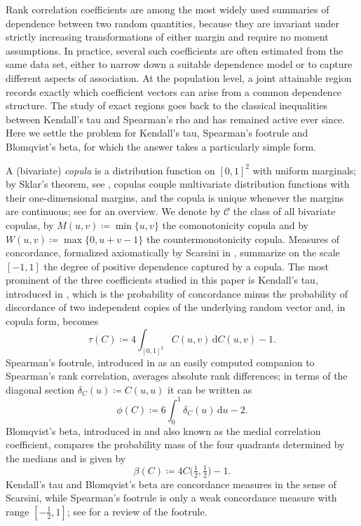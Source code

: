 \documentclass{article}
\newcommand{\C}{\mathcal{C}}
\newcommand{\I}{[0,1]}
\newcommand{\de}{\,\mathrm{d}}
\begin{document}
Rank correlation coefficients are among the most widely used summaries of dependence between two random quantities, because they are invariant under strictly increasing transformations of either margin and require no moment assumptions.
In practice, several such coefficients are often estimated from the same data set, either to narrow down a suitable dependence model or to capture different aspects of association.
At the population level, a joint attainable region records exactly which coefficient vectors can arise from a common dependence structure.
The study of exact regions goes back to the classical inequalities between Kendall's tau and Spearman's rho and has remained active ever since.
Here we settle the problem for Kendall's tau, Spearman's footrule and Blomqvist's beta, for which the answer takes a particularly simple form.

A (bivariate) \emph{copula} is a distribution function on $\I^2$ with uniform marginals; by Sklar's theorem, see \cite{sklar1959fonctions}, copulas couple multivariate distribution functions with their one-dimensional margins, and the copula is unique whenever the margins are continuous; see \cite{nelsen2006introduction,durante2016principles} for an overview.
We denote by $\C$ the class of all bivariate copulas, by $M(u,v)\coloneqq \min\{u,v\}$ the comonotonicity copula and by $W(u,v)\coloneqq \max\{0,u+v-1\}$ the countermonotonicity copula.
Measures of concordance, formalized axiomatically by Scarsini in \cite{scarsini1984measures}, summarize on the scale $[-1,1]$ the degree of positive dependence captured by a copula.
The most prominent of the three coefficients studied in this paper is Kendall's tau, introduced in \cite{kendall1938new}, which is the probability of concordance minus the probability of discordance of two independent copies of the underlying random vector and, in copula form, becomes
\begin{equation}\label{eq:tau-def}
\tau(C)\coloneqq 4\int_{\I^2} C(u,v)\de C(u,v)-1.
\end{equation}
Spearman's footrule, introduced in \cite{spearman1906footrule} as an easily computed companion to Spearman's rank correlation, averages absolute rank differences; in terms of the diagonal section $\delta_C(u)\coloneqq C(u,u)$ it can be written as
\begin{equation}\label{eq:phi-def}
\phi(C)\coloneqq 6\int_0^1 \delta_C(u)\de u-2.
\end{equation}
Blomqvist's beta, introduced in \cite{blomqvist1950measure} and also known as the medial correlation coefficient, compares the probability mass of the four quadrants determined by the medians and is given by
\begin{equation}\label{eq:beta-def}
\beta(C)\coloneqq 4C\bigl(\tfrac12,\tfrac12\bigr)-1.
\end{equation}
Kendall's tau and Blomqvist's beta are concordance measures in the sense of Scarsini, while Spearman's footrule is only a weak concordance measure with range $[-\frac12,1]$; see \cite{genest2010spearman} for a review of the footrule.
\end{document}
